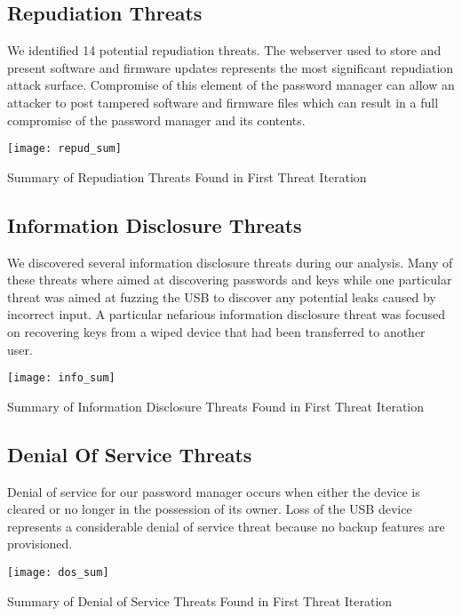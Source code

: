 \subsection{Repudiation Threats}


We identified 14 potential repudiation threats.  The webserver used to store and present software and firmware updates
represents the most significant repudiation attack surface.  Compromise of this
element of the password manager can allow an attacker to post tampered software
and firmware files which can result in a full compromise of the password manager
and its contents.
\begin{table*}[]
    \centering
    \texttt{[image: repud\_sum]}
    \caption{Summary of Repudiation Threats Found in First Threat Iteration}
    \label{tab:repudsum}
\end{table*}



\subsection{Information Disclosure Threats}
We discovered several information disclosure threats during our analysis.  Many
of these threats where aimed at discovering passwords and keys while one
particular threat was aimed at fuzzing the USB to discover any potential leaks
caused by incorrect input.  A particular nefarious information disclosure threat
was focused on recovering keys from a wiped device that had been transferred to
another user. 

\begin{table*}[]
    \centering
    \texttt{[image: info\_sum]}
    \caption{Summary of Information Disclosure Threats Found in First Threat Iteration}
    \label{tab:infosum}
\end{table*}


\subsection{Denial Of Service Threats}
Denial of service for our password manager occurs when either the device is
cleared or no longer in the possession of its owner.  Loss of the USB device
represents a considerable denial of service threat because no backup features
are provisioned.
\begin{table*}[ht]
    \centering
    \texttt{[image: dos\_sum]}
    \caption{Summary of Denial of Service Threats Found in First Threat Iteration}
    \label{tab:dossum}
\end{table*}

